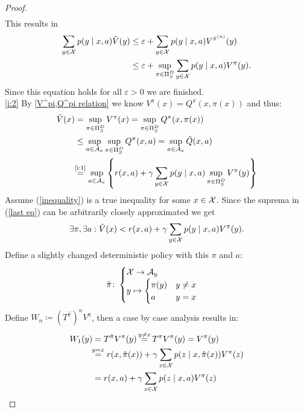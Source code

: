 \begin{proof}
\begin{align*}
	\end{align*}
	This results in
	\begin{align*}
		\sum_{y\in\mathcal{X}}p(y\mid x,a)\tilde{V}(y) 
		&\le \varepsilon + \sum_{y\in\mathcal{X}}p(y\mid x,a) V^{\hat{\pi}^{(n)}}(y) \\
		&\le \varepsilon + \sup_{\pi\in\Pi_S^D} \sum_{y\in\mathcal{X}}p(y\mid x,a) V^\pi(y).
	\end{align*}
	Since this equation holds for all \(\varepsilon>0\) we are finished.
	\\
	\ref{i:2}
	By \ref{V^pi,Q^pi relation} we know \(V^\pi(x)=Q^\pi(x,\pi(x))\) and thus:
	\begin{align}
		\tilde{V}(x)& =\sup_{\pi \in \detPolicy} V^\pi(x)
		=\sup_{\pi \in \detPolicy}Q^\pi(x,\pi(x)) 
		\nonumber\\
		&\le\sup_{a\in \cA_x} \sup_{\pi\in\detPolicy} Q^\pi(x,a)
		=\sup_{a\in \cA_x} \tilde{Q}(x,a)
		\label{inequality}
		\\
		&\lxeq{\text{\ref{i:1}}} \sup_{a\in \cA_x}\left\{ r(x,a)+\gamma\sum\limits_{y\in\cX}p(y\mid x,a) 
		\sup_{\pi\in\detPolicy} V^\pi(y) \right\} \label{last eq}
	\end{align}
	Assume (\ref{inequality}) is a true inequality for some \(x\in\mathcal{X}\). Since the suprema in (\ref{last eq}) can be arbitrarily closely approximated we get 
	\[ 
		\exists \pi, \exists a : \tilde{V}(x) < r(x,a) 
		+ \gamma\sum_{y\in\mathcal{X}} p(y\mid x,a) V^\pi(y).
	\]
	Define a slightly changed deterministic policy with this \(\pi\) and \(a\):
	\begin{align*}
		\hat{\pi}\colon
		\begin{cases}
			\mathcal{X}\to\mathcal{A}_y\\
			y\mapsto
			\begin{cases}
				\pi(y) & y\neq x\\
				a & y=x
			\end{cases}
		\end{cases}
	\end{align*}
	Define \(W_n\coloneqq (T^{\hat{\pi}})^n V^\pi\), then a case by case analysis results in:
	\begin{align*}
		W_1(y)&=T^{\hat{\pi}}V^\pi(y) \xeq{y\neq x} T^\pi V^\pi(y) = V^\pi(y)\\
		&\lxeq{y=x} r(x, \hat{\pi}(x)) 
		+ \gamma \sum_{z\in\cX} p(z \mid x, \hat{\pi}(x)) V^\pi(z)  \\
		&=r(x, a) + \gamma \sum_{z\in\cX} p(z \mid x, a) V^\pi(z) \\

\end{align*}
\end{proof}
